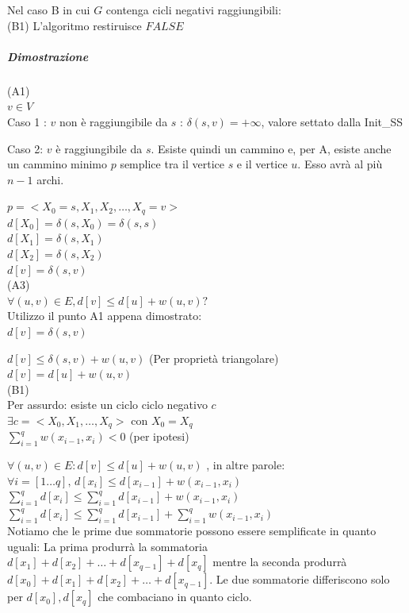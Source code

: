 \documentclass[tikz]{article}
\let\oldsubparagraph\subparagraph
\renewcommand{\subparagraph}[1]{\oldsubparagraph{#1}\mbox{}}
\begin{document}
{{Nel caso B in cui $G$ contenga cicli negativi raggiungibili: \\
(B1) L'algoritmo restiruisce $FALSE$

\subparagraph{Dimostrazione}

(A1) \\ 
$v \in V$ \\ 
Caso 1 : $v$ non è raggiungibile da $s$ : $ \delta(s,v) = + \infty $, valore settato dalla Init\_SS

Caso 2: $v$ è raggiungibile da $s$. Esiste quindi un cammino e, per A, esiste anche un cammino minimo $p$ semplice tra il vertice $s$ e il vertice $u$. Esso avrà al più $n-1$ archi.

$p = <X_0=s, X_1, X_2, \ldots, X_q=v>$ \\
$d[X_0] = \delta(s,X_0) = \delta(s,s)$ \\
$d[X_1] = \delta(s,X_1)$ \\
$d[X_2] = \delta(s,X_2)$ \\
$d[v] = \delta(s,v)$ \\

(A3) \\ 
$\forall (u,v) \in E, d[v] \leq d[u] + w(u,v) ? $\\
Utilizzo il punto A1 appena dimostrato:\\
$d[v] = \delta(s,v)$

$d[v] \leq \delta(s,v) + w(u,v)$ (Per proprietà triangolare)\\
$d[v] = d[u] + w(u,v)$ \\

(B1) \\ 
Per assurdo: esiste un ciclo ciclo negativo $c$ \\
$\exists c = <X_0,X_1,\ldots,X_q>$ con $X_0 =  X_q$ \\ 
$\sum_{i=1}^{q}{w(x_{i-1},x_i)} < 0$ (per ipotesi)

$\forall (u,v) \in E : d[v] \leq d[u] + w(u,v)$ , in altre parole: \\
$\forall i = [1\ldots q],\,d[x_i] \leq d[x_{i-1}] + w(x_{i-1},x_i)$ \\ 

$\sum_{i=1}^q{d[x_i]} \leq \sum_{i=1}^q{d[x_{i-1}] + w(x_{i-1},x_i)}$ \\

$\sum_{i=1}^q{d[x_i]} \leq \sum_{i=1}^q{d[x_{i-1}]} + \sum_{i=1}^q{w(x_{i-1},x_i)}$ \\

Notiamo che le prime due sommatorie possono essere semplificate in quanto uguali: La prima produrrà la sommatoria $d[x_1] + d[x_2] +\ldots + d[x_{q-1}] + d[x_q]$ mentre la seconda produrrà  $d[x_0] + d[x_1] + d[x_2] +\ldots + d[x_{q-1}]$. Le due sommatorie differiscono solo per $d[x_0],d[x_q]$ che combaciano in quanto ciclo.

}}
\end{document}
